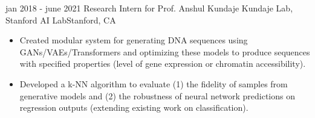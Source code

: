 \begin{cventries}
 \cventry
    {jan 2018 - june 2021}
    {Research Intern for Prof. Anshul Kundaje}
    {Kundaje Lab, Stanford AI Lab}{Stanford, CA}
    {\vspace{-4mm}
     \begin{itemize}[leftmargin=5mm]
          \item Created modular system for generating DNA sequences using GANs/VAEs/Transformers and optimizing these models to produce sequences with specified properties (level of gene expression or chromatin accessibility).
          \item Developed a k-NN algorithm to evaluate (1) the fidelity of samples from generative models and (2) the robustness of neural network predictions on regression outputs (extending existing work on classification).
     \end{itemize}}\vspace{-4mm}
     
     
    


\end{cventries}

